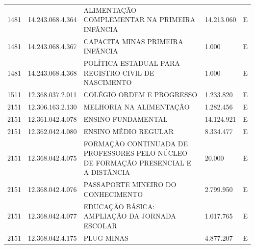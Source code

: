 \documentclass{article}
\begin{document}
\begin{longtable}[c]{m{1cm}|m{2cm}|m{10cm}|m{2cm}|m{1cm}}
\multicolumn{1}{C{1cm}|}{1481} & \multicolumn{1}{C{2cm}|}{14.243.068.4.364} & \multicolumn{1}{L{10cm}|}{ALIMENTAÇÃO COMPLEMENTAR NA PRIMEIRA INFÂNCIA} & \multicolumn{1}{R{2cm}|}{14.213.060} & \multicolumn{1}{C{1cm}}{E} \\
\multicolumn{1}{C{1cm}|}{1481} & \multicolumn{1}{C{2cm}|}{14.243.068.4.367} & \multicolumn{1}{L{10cm}|}{CAPACITA MINAS PRIMEIRA INFÂNCIA} & \multicolumn{1}{R{2cm}|}{1.000} & \multicolumn{1}{C{1cm}}{E} \\
\multicolumn{1}{C{1cm}|}{1481} & \multicolumn{1}{C{2cm}|}{14.243.068.4.368} & \multicolumn{1}{L{10cm}|}{POLÍTICA ESTADUAL PARA REGISTRO CIVIL DE NASCIMENTO} & \multicolumn{1}{R{2cm}|}{1.000} & \multicolumn{1}{C{1cm}}{E} \\
\multicolumn{1}{C{1cm}|}{1511} & \multicolumn{1}{C{2cm}|}{12.368.037.2.011} & \multicolumn{1}{L{10cm}|}{COLÉGIO ORDEM E PROGRESSO} & \multicolumn{1}{R{2cm}|}{1.233.820} & \multicolumn{1}{C{1cm}}{E} \\
\multicolumn{1}{C{1cm}|}{2151} & \multicolumn{1}{C{2cm}|}{12.306.163.2.130} & \multicolumn{1}{L{10cm}|}{MELHORIA NA ALIMENTAÇÃO} & \multicolumn{1}{R{2cm}|}{1.282.456} & \multicolumn{1}{C{1cm}}{E} \\
\multicolumn{1}{C{1cm}|}{2151} & \multicolumn{1}{C{2cm}|}{12.361.042.4.078} & \multicolumn{1}{L{10cm}|}{ENSINO FUNDAMENTAL} & \multicolumn{1}{R{2cm}|}{14.124.921} & \multicolumn{1}{C{1cm}}{E} \\
\multicolumn{1}{C{1cm}|}{2151} & \multicolumn{1}{C{2cm}|}{12.362.042.4.080} & \multicolumn{1}{L{10cm}|}{ENSINO MÉDIO REGULAR} & \multicolumn{1}{R{2cm}|}{8.334.477} & \multicolumn{1}{C{1cm}}{E} \\
\multicolumn{1}{C{1cm}|}{2151} & \multicolumn{1}{C{2cm}|}{12.368.042.4.075} & \multicolumn{1}{L{10cm}|}{FORMAÇÃO CONTINUADA DE PROFESSORES PELO NÚCLEO DE FORMAÇÃO PRESENCIAL E A DISTÂNCIA} & \multicolumn{1}{R{2cm}|}{20.000} & \multicolumn{1}{C{1cm}}{E} \\
\multicolumn{1}{C{1cm}|}{2151} & \multicolumn{1}{C{2cm}|}{12.368.042.4.076} & \multicolumn{1}{L{10cm}|}{PASSAPORTE MINEIRO DO CONHECIMENTO} & \multicolumn{1}{R{2cm}|}{2.799.950} & \multicolumn{1}{C{1cm}}{E} \\
\multicolumn{1}{C{1cm}|}{2151} & \multicolumn{1}{C{2cm}|}{12.368.042.4.077} & \multicolumn{1}{L{10cm}|}{EDUCAÇÃO BÁSICA: AMPLIAÇÃO DA JORNADA ESCOLAR} & \multicolumn{1}{R{2cm}|}{1.017.765} & \multicolumn{1}{C{1cm}}{E} \\
\multicolumn{1}{C{1cm}|}{2151} & \multicolumn{1}{C{2cm}|}{12.368.042.4.175} & \multicolumn{1}{L{10cm}|}{PLUG MINAS} & \multicolumn{1}{R{2cm}|}{4.877.207} & \multicolumn{1}{C{1cm}}{E} \\

\end{longtable}
\end{document}

